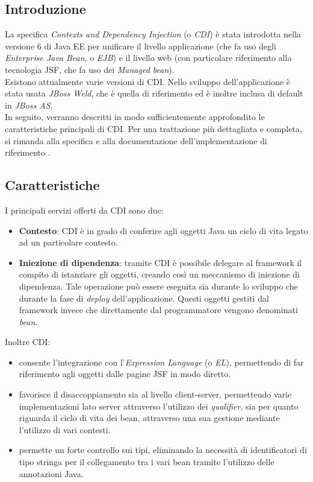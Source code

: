 \subsection{Introduzione}

La specifica \textsl{Contexts and Dependency Injection} (o \textsl{CDI}) è stata introdotta nella versione 6 di Java EE per unificare il livello applicazione (che fa uso degli \textsl{Enterprise Java Bean}, o \textsl{EJB}) e il livello web (con particolare riferimento alla tecnologia JSF, che fa uso dei \textsl{Managed bean}).\\
Esistono attualmente varie versioni di CDI. Nello sviluppo dell'applicazione è stata usata \textsl{JBoss Weld}, che è quella di riferimento ed è inoltre inclusa di default in \textsl{JBoss AS}.\\
In seguito, verranno descritti in modo sufficientemente approfondito le caratteristiche principali di CDI. Per una trattazione più dettagliata e completa, si rimanda alla specifica \cite{cdi} e alla documentazione dell'implementazione di riferimento \cite{weld}.

\subsection{Caratteristiche}

I principali servizi offerti da CDI sono due:

\begin{itemize}
\item \textbf{Contesto}: CDI è in grado di conferire agli oggetti Java un ciclo di vita legato ad un particolare contesto.
\item \textbf{Iniezione di dipendenza}: tramite CDI è possibile delegare al framework il compito di istanziare gli oggetti, creando così un meccanismo di iniezione di dipendenza. Tale operazione può essere eseguita sia durante lo sviluppo che durante la fase di \textit{deploy} dell'applicazione. Questi oggetti gestiti dal framework invece che direttamente dal programmatore vengono denominati \textsl{bean}.
\end{itemize}

Inoltre CDI:

\begin{itemize}
\item consente l'integrazione con l'\textsl{Expression Language} (o \textsl{EL}), permettendo di far riferimento agli oggetti dalle pagine JSF in modo diretto.
\item favorisce il disaccoppiamento sia al livello client-server, permettendo varie implementazioni lato server attraverso l'utilizzo dei \textit{qualifier}, sia per quanto riguarda il ciclo di vita dei bean, attraverso una sua gestione mediante l'utilizzo di vari contesti.
\item permette un forte controllo sui tipi, eliminando la necessità di identificatori di tipo stringa per il collegamento tra i vari bean tramite l'utilizzo delle annotazioni Java.
\end{itemize}

